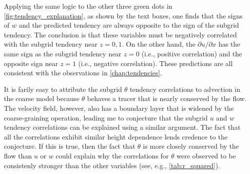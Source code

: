 \documentclass[../main.tex]{subfiles}
\begin{document}
Applying the same logic to the other three green dots in
\cref{fig:tendency_explanation}, as shown by the text boxes, one finds that the
signs of $w$ and the predicted tendency are always opposite to the sign of the
subgrid tendency. The conclusion is that these variables must be negatively
correlated with the subgrid tendency near $z=0,1$. On the other hand, the
$\partial u/\partial x$ has the same sign as the subgrid tendency near $z=0$
(i.e., positive correlation) and the opposite sign near $z=1$ (i.e., negative
correlation). These predictions are all consistent with the observations in
\cref{chap:tendencies}.

It is farily easy to attribute the subgrid $\theta$ tendency correlations to
advection in the coarse model because $\theta$ behaves a tracer that is nearly
conserved by the flow. The velocity field, however, also has a boundary layer
that is widened by the coarse-graining operation, leading me to conjecture that
the subgrid $u$ and $w$ tendency correlations can be explained using a similar
argument. The fact that all the correlations exhibit similar height dependence
lends credence to the conjecture. If this is true, then the fact that $\theta$
is more closely conserved by the flow than $u$ or $w$ could explain why the
correlations for $\theta$ were observed to be consistenly stronger than the
other variables (see, e.g., \cref{tab:r_squared}).
\end{document}
